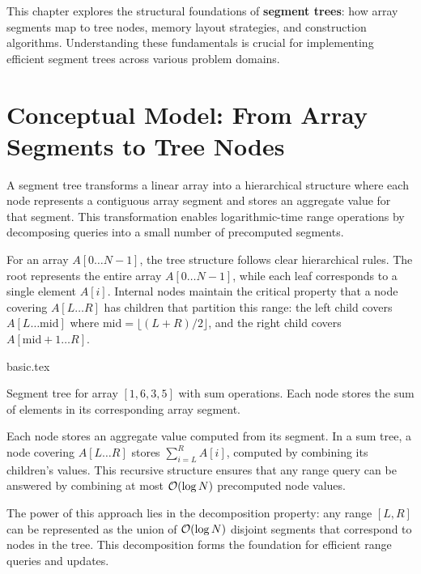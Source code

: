\label{chap:segment_tree_structure}

This chapter explores the structural foundations of \textbf{segment trees}: how array segments map to tree nodes, memory layout strategies, and construction algorithms. Understanding these fundamentals is crucial for implementing efficient segment trees across various problem domains.

\section{Conceptual Model: From Array Segments to Tree Nodes}
\label{sec:conceptual_model}

A segment tree transforms a linear array into a hierarchical structure where each node represents a contiguous array segment and stores an aggregate value for that segment. This transformation enables logarithmic-time range operations by decomposing queries into a small number of precomputed segments.

For an array $A[0 \ldots N-1]$, the tree structure follows clear hierarchical rules. The root represents the entire array $A[0 \ldots N-1]$, while each leaf corresponds to a single element $A[i]$. Internal nodes maintain the critical property that a node covering $A[L \ldots R]$ has children that partition this range: the left child covers $A[L \ldots \text{mid}]$ where $\text{mid} = \lfloor(L+R)/2\rfloor$, and the right child covers $A[\text{mid}+1 \ldots R]$.

\begin{marginfigure}
{basic.tex}
\caption{Segment tree for array $[1,6,3,5]$ with sum operations. Each node stores the sum of elements in its corresponding array segment.}
\label{fig:segment_tree_example}
\end{marginfigure}

Each node stores an aggregate value computed from its segment. In a sum tree, a node covering $A[L \ldots R]$ stores $\sum_{i=L}^{R} A[i]$, computed by combining its children's values. This recursive structure ensures that any range query can be answered by combining at most $\mathcal{O}(\log N)$ precomputed node values.

The power of this approach lies in the decomposition property: any range $[L,R]$ can be represented as the union of $\mathcal{O}(\log N)$ disjoint segments that correspond to nodes in the tree. This decomposition forms the foundation for efficient range queries and updates.

